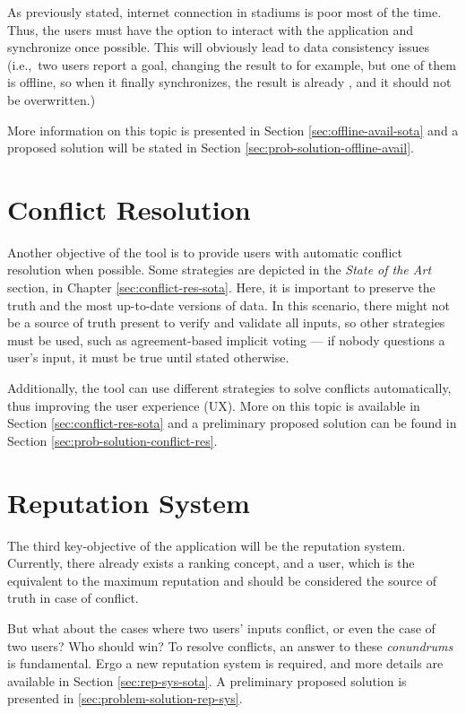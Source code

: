 As previously stated, internet connection in stadiums is poor most of the time. Thus, the users must have the option to interact with the application and synchronize once possible. This will obviously lead to data consistency issues (i.e.,\ two users report a goal, changing the result to  for example, but one of them is offline, so when it finally synchronizes, the result is already , and it should not be overwritten.)

More information on this topic is presented in Section \ref{sec:offline-avail-sota} and a proposed solution will be stated in Section \ref{sec:prob-solution-offline-avail}.

\section{Conflict Resolution} \label{sec:conflict-res-intro}

Another objective of the tool is to provide users with automatic conflict resolution when possible. Some strategies are depicted in the \textit{State of the Art} section, in Chapter \ref{sec:conflict-res-sota}. Here, it is important to preserve the truth and the most up-to-date versions of data. In this scenario, there might not be a source of truth present to verify and validate all inputs, so other strategies must be used, such as agreement-based implicit voting --- if nobody questions a user's input, it must be true until stated otherwise.

Additionally, the tool can use different strategies to solve conflicts automatically, thus improving the user experience (UX). More on this topic is available in Section \ref{sec:conflict-res-sota} and a preliminary proposed solution can be found in Section \ref{sec:prob-solution-conflict-res}.

\section{Reputation System} \label{sec:rep-sys-intro}

The third key-objective of the application will be the reputation system. Currently, there already exists a ranking concept, and a  user, which is the equivalent to the maximum reputation and should be considered the source of truth in case of conflict.

But what about the cases where two  users' inputs conflict, or even the case of two  users? Who should win? To resolve conflicts, an answer to these \textit{conundrums} is fundamental. Ergo a new reputation system is required, and more details are available in Section \ref{sec:rep-sys-sota}. A preliminary proposed solution is presented in \ref{sec:problem-solution-rep-sys}.
